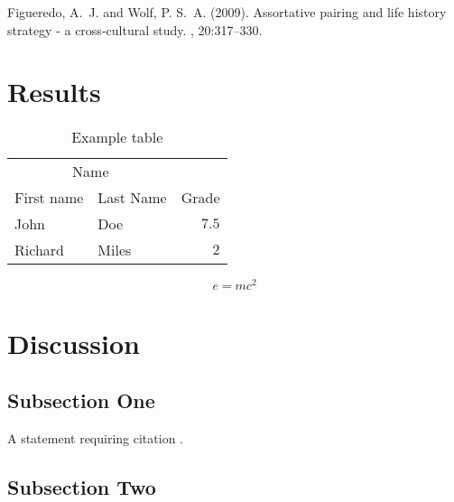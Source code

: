 \documentclass[twoside,twocolumn]{article}
\begin{document}

\begin{thebibliography}{99} %

Figueredo, A.~J. and Wolf, P. S.~A. (2009).
\newblock Assortative pairing and life history strategy - a cross-cultural
  study.
, 20:317--330.
 
\end{thebibliography}


\section{Results}

\begin{table}
\caption{Example table}
\centering
\begin{tabular}{llr}
\toprule
\multicolumn{2}{c}{Name} \\
\cmidrule(r){1-2}
First name & Last Name & Grade \\
\midrule
John & Doe & $7.5$ \\
Richard & Miles & $2$ \\
\bottomrule
\end{tabular}
\end{table}

\blindtext %

\begin{equation}
\label{eq:emc}
e = mc^2
\end{equation}

\blindtext %


\section{Discussion}

\subsection{Subsection One}

A statement requiring citation \cite{Figueredo:2009dg}.
\blindtext %

\subsection{Subsection Two}

\blindtext %
\end{document}
